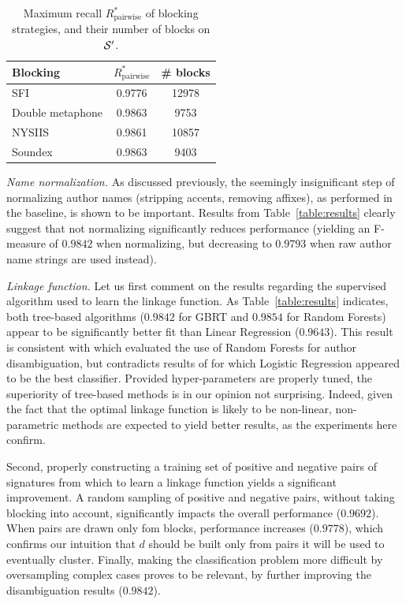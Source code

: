 \documentclass[conference]{IEEEtran}
\begin{document}
\begin{table}
\caption{Maximum recall $R_\text{pairwise}^*$ of blocking strategies, and their number of blocks on ${\cal S}^\prime$.}
\label{table:blocking}
\centering
\begin{tabular}{|l|c|c|}
  \hline
  \textbf{Blocking} & $R_\text{pairwise}^*$ & \# blocks \\
  \hline
  \hline
    SFI & 0.9776 & 12978 \\
    Double metaphone & 0.9863 & 9753 \\
    NYSIIS & 0.9861 & 10857 \\
    Soundex & 0.9863 & 9403 \\
  \hline
\end{tabular}
\end{table}



\textit{Name normalization.} As discussed previously, the seemingly insignificant step of
normalizing author names (stripping accents, removing affixes), as performed in the
baseline, is shown to be important. Results from Table~\ref{table:results} clearly suggest that not
normalizing significantly reduces performance (yielding an F-measure of $0.9842$ when normalizing,
but decreasing to $0.9793$ when raw author name strings are used instead).

\textit{Linkage function.} Let us first comment on the results regarding the
supervised algorithm used to learn the linkage function.
As Table~\ref{table:results} indicates, both tree-based algorithms ($0.9842$ for GBRT
and $0.9854$ for Random Forests) appear to be
significantly better fit than Linear Regression ($0.9643$). This result is
consistent with \cite{treeratpituk2009disambiguating} which evaluated the use of
Random Forests for author disambiguation, but contradicts results of
\cite{levin2012citation} for which Logistic Regression appeared to be the best
classifier.
Provided hyper-parameters are properly tuned, the superiority of
tree-based methods is in our opinion not surprising.
Indeed, given the fact that the optimal linkage function is likely to be non-linear, non-parametric
methods are expected to yield better results, as the experiments here confirm.

Second, properly constructing a training set of positive and negative pairs of
signatures from which to learn a linkage function yields a significant
improvement.
A random sampling of positive and negative pairs, without taking
blocking into account, significantly impacts the overall performance
($0.9692$). When pairs are drawn only fom blocks, performance increases
($0.9778$), which confirms our intuition that $d$ should be built only from
pairs it will be used to eventually cluster. Finally, making the classification
problem more difficult by oversampling complex cases proves to be relevant,
by further improving the disambiguation results ($0.9842$).
\end{document}
